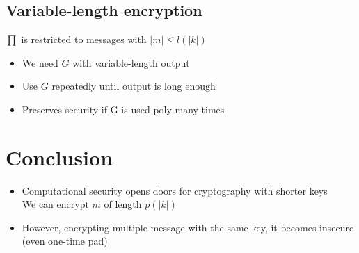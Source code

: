 \documentclass[12pt]{article}
\begin{document}
\subsection{Variable-length encryption}
$\prod$ is restricted to messages with $|m| \le l(|k|)$
\begin{itemize}
\item We need $G$ with variable-length output
\item Use $G$ repeatedly until output is long enough
\item Preserves security if G is used poly many times
\end{itemize}
\section{Conclusion}
\begin{itemize}
\item Computational security opens doors for cryptography with shorter keys\\
We can encrypt $m$ of length $p(|k|)$
\item However, encrypting multiple message with the same key, it becomes insecure (even one-time pad)
\end{itemize}
\end{document}
